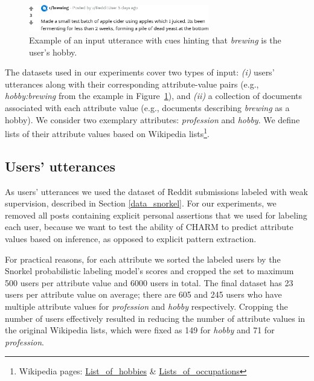 
\vspace{-5pt}
\begin{figure}[th!]
\centering
\includegraphics[width=0.7\textwidth]{imgs/brew.png}
\caption[Example of an input utterance to CHARM.]{
Example of an input utterance with cues hinting that \emph{brewing} is the user's hobby.
}
\label{fig:input}
\end{figure}

\vspace{-5pt}
The datasets used in our experiments cover two types of input: \emph{(i)} users' utterances along with their corresponding attribute-value pairs (e.g., \emph{hobby:brewing} from the example in Figure~\ref{fig:input}),
and 
\emph{(ii)} a collection of documents associated with each attribute value
(e.g., documents describing \emph{brewing} as a hobby).
We consider two exemplary attributes: \emph{profession} and \emph{hobby}.
We define lists of their attribute values based on Wikipedia lists\footnote{Wikipedia pages: \href{https://en.wikipedia.org/wiki/List_of_hobbies}{{List\_of\_hobbies}} \& \href{https://en.wikipedia.org/wiki/Lists_of_occupations}{{Lists\_of\_occupations}}}.

\vspace{-5pt}
\subsection{Users' utterances}

As users' utterances we used the dataset of Reddit submissions labeled with weak supervision, described in Section \ref{data_snorkel}.
For our experiments,
we removed all posts containing explicit personal assertions that we used for labeling each user, because we want to test the ability of CHARM to predict attribute values based on inference, as opposed to explicit pattern extraction. 

For practical reasons, for each attribute
we sorted the labeled users by the Snorkel probabilistic labeling model's scores and cropped the set to maximum 500 users per attribute value and 6000 users in total. 
The final dataset has 23 users per attribute value on average; there are 605 and 245 users who have multiple attribute values for \textit{profession} and \textit{hobby} respectively. Cropping the number of users effectively resulted in reducing the number of attribute values in the original Wikipedia lists, which were fixed as 149 for {\em hobby} and 71 for {\em profession}. 

